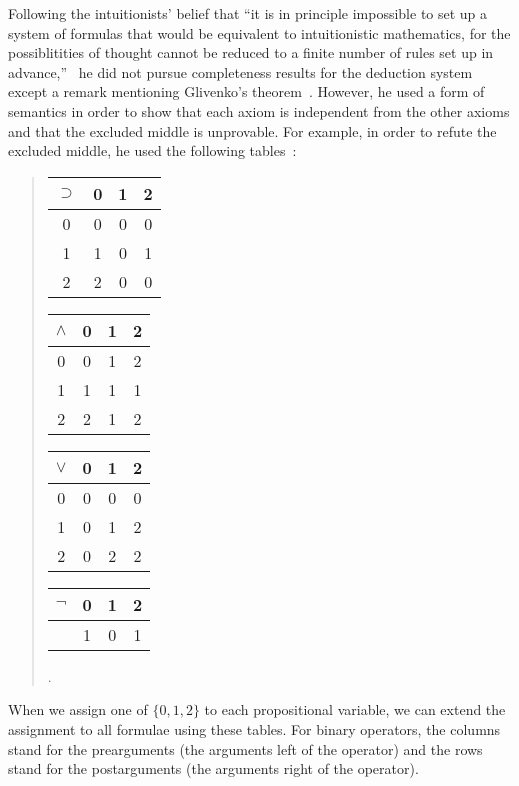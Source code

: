 Following the intuitionists' belief
that ``it is in principle impossible to set up a system of formulas that
would be equivalent to intuitionistic mathematics, for the
possiblitities of thought cannot be reduced to a finite number of rules
set up in advance,''~\citep{heyting1930} he did not pursue completeness
results for the deduction system
except a remark mentioning Glivenko's theorem~\citep{glivenko0,glivenko1}.
However, he used a form of semantics in order to show that
each axiom is independent from the other axioms and that
the excluded middle is unprovable.
For example, in order to refute the excluded middle, he used the
following tables~\citep{heyting1930}:\\
 \begin{quotation}
 \begin{center}
  \begin{tabular}{c|ccc}
   $\supset $& 0  & 1  & 2 \\ \hline
   0 & 0 & 0 & 0 \\
   1 & 1 & 0 & 1 \\
   2 & 2 & 0 & 0
  \end{tabular}
  \hfill
  \begin{tabular}{c|ccc}
   $\wedge $& 0 & 1& 2\\ \hline
   0 & 0 & 1 & 2\\
   1 & 1 & 1 & 1\\
   2 & 2 & 1 & 2\\
  \end{tabular}
  \hfill
  \begin{tabular}{c|ccc}
   $\vee$& 0 & 1 & 2\\ \hline
   0 & 0 & 0 & 0 \\
   1 & 0 & 1 & 2 \\
   2 & 0 & 2 & 2\\
  \end{tabular}
  \hfill
  \begin{tabular}{c|ccc}
   $\neg $& 0 & 1 & 2\\ \hline
   & 1 & 0 & 1\\
  \end{tabular}\enspace.
 \end{center}
 \end{quotation}
When we assign one of $\{0,1,2\}$ to each propositional variable, we
can extend the assignment to all formulae using these tables.
For binary operators, the columns stand for the prearguments (the
arguments left of the operator) and the
rows stand for the postarguments (the arguments right of the operator).
